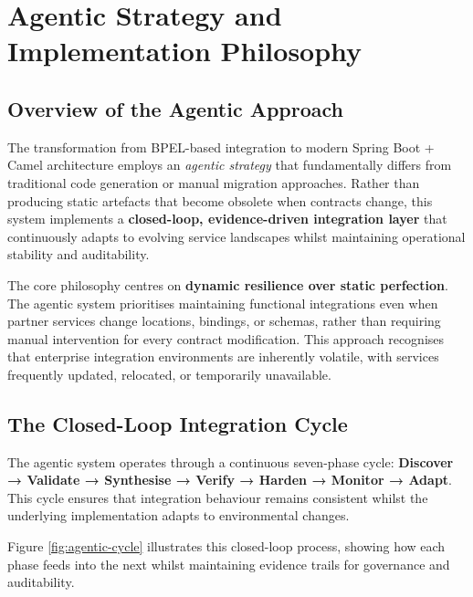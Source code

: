 \documentclass[11pt,a4paper]{article}
\begin{document}
\section{Agentic Strategy and Implementation Philosophy}
\subsection{Overview of the Agentic Approach}
The transformation from BPEL-based integration to modern Spring Boot + Camel architecture employs an \emph{agentic strategy} that fundamentally differs from traditional code generation or manual migration approaches. Rather than producing static artefacts that become obsolete when contracts change, this system implements a \textbf{closed-loop, evidence-driven integration layer} that continuously adapts to evolving service landscapes whilst maintaining operational stability and auditability.

The core philosophy centres on \textbf{dynamic resilience over static perfection}. The agentic system prioritises maintaining functional integrations even when partner services change locations, bindings, or schemas, rather than requiring manual intervention for every contract modification. This approach recognises that enterprise integration environments are inherently volatile, with services frequently updated, relocated, or temporarily unavailable.

\subsection{The Closed-Loop Integration Cycle}
The agentic system operates through a continuous seven-phase cycle: \textbf{Discover → Validate → Synthesise → Verify → Harden → Monitor → Adapt}. This cycle ensures that integration behaviour remains consistent whilst the underlying implementation adapts to environmental changes.

Figure \ref{fig:agentic-cycle} illustrates this closed-loop process, showing how each phase feeds into the next whilst maintaining evidence trails for governance and auditability.
\end{document}
